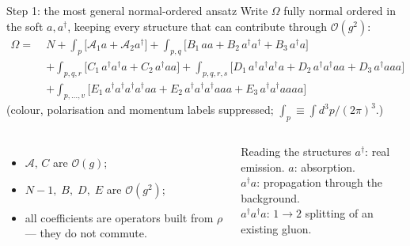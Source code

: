 \documentclass[9pt,aspectratio=169]{beamer}
\newcommand{\hl}[1]{\textcolor{acc}{#1}}
\newcommand{\Om}{\Omega}
\newcommand{\ad}{a^{\dagger}}
\begin{document}
\begin{frame}{Step 1: the most general normal-ordered ansatz}
Write $\Om$ fully normal ordered in the soft $a,\ad$, keeping every structure that can
contribute through $\mathcal{O}(g^{2})$:
\small
\begin{align*}
\Om=\;& N
 +\int_{p}\Big[\mathcal{A}_{1}a+\mathcal{A}_{2}\ad\Big]
 +\int_{p,q}\Big[B_{1}\,aa+B_{2}\,\ad\ad+B_{3}\,\ad a\Big]\\
 &+\int_{p,q,r}\Big[C_{1}\,\ad\ad a + C_{2}\,\ad a a\Big]
  +\int_{p,q,r,s}\Big[D_{1}\,\ad\ad\ad a + D_{2}\,\ad\ad a a + D_{3}\,\ad a a a\Big]\\
 &+\int_{p,\dots,v}\Big[E_{1}\,\ad\ad\ad\ad a a + E_{2}\,\ad\ad\ad a a a + E_{3}\,\ad\ad a a a a\Big]
\end{align*}
\normalsize
(colour, polarisation and momentum labels suppressed; $\int_p\equiv\int\! d^3p/(2\pi)^3$.)
\medskip
\begin{columns}[T,onlytextwidth]
\begin{itemize}
  \item $\mathcal{A},\,C$ are $\mathcal{O}(g)$;
  \item $N-1,\;B,\;D,\;E$ are $\mathcal{O}(g^{2})$;
  \item all coefficients are \hl{operators} built from $\rho$ --- they do not commute.
\end{itemize}
\begin{block}{Reading the structures}
$\ad$: real emission. $a$: absorption.\\
$\ad a$: propagation through the background.\\
$\ad\ad a$: $1\!\to\!2$ splitting of an existing gluon.
\end{block}
\end{columns}
\end{frame}
\end{document}
